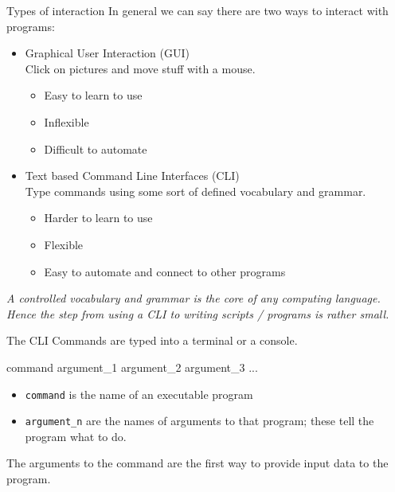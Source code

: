\documentclass[pdf]{beamer}
\begin{document}
\begin{frame}{Types of interaction}
  In general we can say there are two ways to interact with programs:
  
  \begin{itemize}
    \item Graphical User Interaction (GUI)\\
      Click on pictures and move stuff with a mouse.
      \begin{itemize}
      \item Easy to learn to use
      \item Inflexible
      \item Difficult to automate
      \end{itemize}
    \item Text based Command Line Interfaces (CLI)\\
      Type commands using some sort of defined vocabulary and grammar.
      \begin{itemize}
      \item Harder to learn to use
      \item Flexible
      \item Easy to automate and connect to other programs
      \end{itemize}
  \end{itemize}
  
  \emph{A controlled vocabulary and grammar is the core of any computing
  language. Hence the step from using a CLI to writing scripts / programs is
  rather small.}  
\end{frame}

\begin{frame}[fragile]{The CLI}
  Commands are typed into a terminal or a console.

  \begin{shcode}
    command argument_1 argument_2 argument_3 ...
  \end{shcode}
  
  \begin{itemize}
  \item \texttt{command} is the name of an executable program
  \item \texttt{argument\_n} are the names of arguments to that program; these
    tell the program what to do.
  \end{itemize}
  
  The arguments to the command are the first way to provide input data to the program.
\end{frame}
\end{document}
